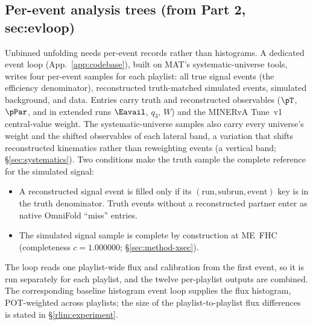 \subsection{Per-event analysis trees (from Part 2, sec:evloop)}
Unbinned unfolding needs per-event records rather than histograms. A dedicated event loop (App.~\ref{app:codebase}), built on MAT's systematic-universe tools, writes four per-event samples for each playlist: all true signal events (the efficiency denominator), reconstructed truth-matched simulated events, simulated background, and data. Entries carry truth and reconstructed observables ($\pT$, $\pPar$, and in extended runs $\Eavail$, $q_{3}$, $W$) and the MINERvA Tune~v1 central-value weight. The systematic-universe samples also carry every universe's weight and the shifted observables of each lateral band, a variation that shifts reconstructed kinematics rather than reweighting events (a vertical band; \S\ref{sec:systematics}). Two conditions make the truth sample the complete reference for the simulated signal:
\begin{itemize}
  \item A reconstructed signal event is filled only if its $(\mathrm{run},\mathrm{subrun},\mathrm{event})$ key is in the truth denominator. Truth events without a reconstructed partner enter as native OmniFold ``miss'' entries.
  \item The simulated signal sample is complete by construction at ME~FHC (completeness $c=1.000000$; \S\ref{sec:method-xsec}).
\end{itemize}
The loop reads one playlist-wide flux and calibration from the first event, so it is run separately for each playlist, and the twelve per-playlist outputs are combined. The corresponding baseline histogram event loop supplies the flux histogram, POT-weighted across playlists; the size of the playlist-to-playlist flux differences is stated in \S\ref{rlim:experiment}.

